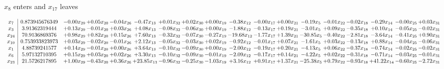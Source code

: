 \documentclass[9pt]{article}
\begin{document}
 $ x_{8} $ enters and $ x_{17} $ leaves 

 \[\begin{array}{c| c c@{\hskip 2pt} c@{\hskip 2pt} c@{\hskip 2pt} c@{\hskip 2pt} c@{\hskip 2pt} c@{\hskip 2pt} c@{\hskip 2pt} c@{\hskip 2pt} c@{\hskip 2pt} c@{\hskip 2pt} c@{\hskip 2pt} c@{\hskip 2pt} c@{\hskip 2pt} c@{\hskip 2pt} c@{\hskip 2pt} c@{\hskip 2pt} }
 x_{7}   &  0.873945676349 & -0.00 x_{29} & +  0.05 x_{20} & -0.04 x_{26} & -0.47 x_{13} & +  0.01 x_{32} & +  0.02 x_{30} & +  0.00 x_{19} & -0.38 x_{12} & -0.00 x_{17} & +  0.00 x_{21} & -0.19 x_{5} & -0.01 x_{22} & -0.02 x_{18} & -0.29 x_{14} & -0.00 x_{25} & +  0.03 x_{31}\\
 x_{3}   &  3.91362319444 & +  0.13 x_{29} & -0.01 x_{20} & +  0.03 x_{26} & +  4.08 x_{13} & -0.08 x_{32} & -0.06 x_{30} & +  0.00 x_{19} & -1.88 x_{12} & -0.13 x_{17} & +  0.19 x_{21} & -3.01 x_{5} & +  0.09 x_{22} & -0.35 x_{18} & +  0.10 x_{14} & -0.05 x_{25} & -0.02 x_{31}\\
 x_{24}   &  70.9136869376 & +  0.98 x_{29} & +  0.82 x_{20} & +  0.15 x_{26} & +  7.60 x_{13} & -0.32 x_{32} & -0.07 x_{30} & -0.27 x_{19} & -19.68 x_{12} & -1.77 x_{17} & +  1.39 x_{21} & -30.85 x_{5} & -0.40 x_{22} & -2.81 x_{18} & -3.64 x_{14} & -0.41 x_{25} & +  0.90 x_{31}\\
 x_{10}   &  0.753933823973 & +  0.03 x_{29} & -0.02 x_{20} & -0.01 x_{26} & +  2.12 x_{13} & -0.05 x_{32} & -0.03 x_{30} & +  0.02 x_{19} & -0.92 x_{12} & -0.01 x_{17} & +  0.07 x_{21} & -1.61 x_{5} & +  0.03 x_{22} & -0.13 x_{18} & +  0.88 x_{14} & -0.04 x_{25} & -0.06 x_{31}\\
 x_{1}   &  4.88739241577 & +  0.14 x_{29} & -0.01 x_{20} & +  0.00 x_{26} & +  3.64 x_{13} & -0.10 x_{32} & -0.09 x_{30} & +  0.00 x_{19} & -2.00 x_{12} & -0.19 x_{17} & +  0.20 x_{21} & -4.13 x_{5} & +  0.06 x_{22} & -0.37 x_{18} & -0.74 x_{14} & -0.02 x_{25} & -0.02 x_{31}\\
 x_{6}   &  5.97132710395 & +  0.15 x_{29} & +  0.03 x_{20} & +  0.02 x_{26} & +  3.30 x_{13} & -0.10 x_{32} & -0.09 x_{30} & -0.01 x_{19} & -2.09 x_{12} & -0.17 x_{17} & +  0.14 x_{21} & -4.22 x_{5} & +  0.02 x_{22} & -0.31 x_{18} & -0.71 x_{14} & -0.03 x_{25} & -0.01 x_{31}\\
 x_{23}   &  21.5726217895 & +  1.00 x_{29} & -0.43 x_{20} & +  0.36 x_{26} & + 23.85 x_{13} & -0.96 x_{32} & -0.25 x_{30} & -1.03 x_{19} & +  3.16 x_{12} & +  0.91 x_{17} & +  1.37 x_{21} & -25.38 x_{5} & +  0.79 x_{22} & -0.93 x_{18} & + 41.22 x_{14} & -0.60 x_{25} & -2.72 x_{31}\\

\end{array}\]
\end{document}
